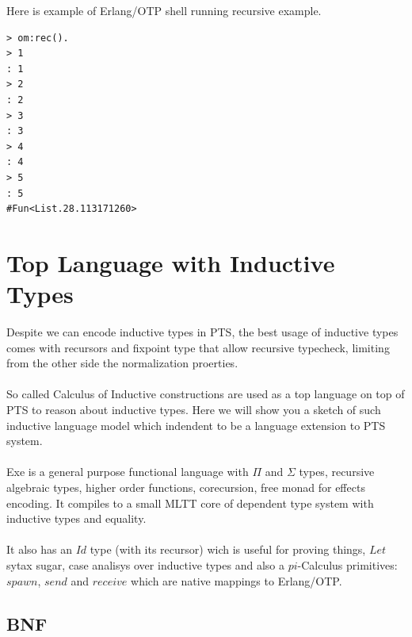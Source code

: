 \documentclass[11pt,oneside]{article}
\begin{document}
Here is example of Erlang/OTP shell running recursive example.

\begin{lstlisting}[mathescape=true]
> om:rec().
> 1
: 1
> 2
: 2
> 3
: 3
> 4
: 4
> 5
: 5
#Fun<List.28.113171260>
\end{lstlisting}




\newpage
\section{Top Language with Inductive Types}

Despite we can encode inductive types in PTS, the best usage of inductive types
comes with recursors and fixpoint type that allow recursive typecheck, limiting
from the other side the normalization proerties.

\paragraph{}
So called Calculus of Inductive constructions are used as a top language on top of
PTS to reason about inductive types. Here we will show you a sketch of such
inductive language model which indendent to be a language extension to PTS system.

\paragraph{}
Exe is a general purpose functional language with $\Pi$ and $\Sigma$ types,
recursive algebraic types, higher order functions,
corecursion, free monad for effects encoding. It compiles
to a small MLTT core of dependent type system with inductive types and equality.

\paragraph{}
It also has an $Id$ type (with its recursor) wich is useful for proving things,
$Let$ sytax sugar, case analisys over inductive types and also a $pi$-Calculus primitives:
$spawn$, $send$ and $receive$ which are native mappings to Erlang/OTP.

\subsection{BNF}
\end{document}
